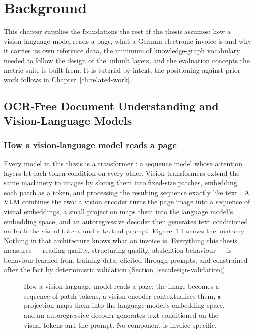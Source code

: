 \chapter{Background}
\label{ch:background}

This chapter supplies the foundations the rest of the thesis assumes: how a
vision-language model reads a page, what a German electronic invoice is and why it
carries its own reference data, the minimum of knowledge-graph vocabulary needed to
follow the design of the unbuilt layers, and the evaluation concepts the metric suite is
built from. It is tutorial by intent; the positioning against prior work follows in
Chapter~\ref{ch:related-work}.

\section{OCR-Free Document Understanding and Vision-Language Models}
\label{sec:bg-vlm}

\subsection{How a vision-language model reads a page}

Every model in this thesis is a transformer \parencite{vaswani2017attention}: a sequence
model whose attention layers let each token condition on every other. Vision
transformers extend the same machinery to images by slicing them into fixed-size
patches, embedding each patch as a token, and processing the resulting sequence exactly
like text \parencite{dosovitskiy2021vit}. A \ac{VLM} combines the two: a vision encoder
turns the page image into a sequence of visual embeddings, a small projection maps them
into the language model's embedding space, and an autoregressive decoder then generates
text conditioned on both the visual tokens and a textual prompt. Figure~\ref{fig:vlm-anatomy}
shows the anatomy. Nothing in that
architecture knows what an invoice is. Everything this thesis measures --- reading
quality, structuring quality, abstention behaviour --- is behaviour learned from
training data, elicited through prompts, and constrained after the fact by deterministic
validation (Section~\ref{sec:design-validation}).

\begin{figure}[htbp]
  \centering
  
  \caption[How a vision-language model reads a page]{How a vision-language model reads a
  page: the image becomes a sequence of patch tokens, a vision encoder contextualises
  them, a projection maps them into the language model's embedding space, and an
  autoregressive decoder generates text conditioned on the visual tokens and the prompt.
  No component is invoice-specific.}
  \label{fig:vlm-anatomy}
\end{figure}


